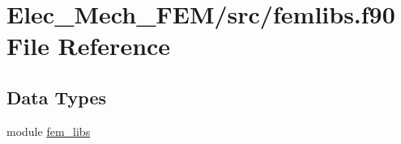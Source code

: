 \hypertarget{femlibs_8f90}{}\section{Elec\+\_\+\+Mech\+\_\+\+F\+E\+M/src/femlibs.f90 File Reference}
\label{femlibs_8f90}
\subsection*{Data Types}
\begin{DoxyCompactItemize}
\item 
module \hyperlink{classfem__libs}{fem\+\_\+libs}
\end{DoxyCompactItemize}
